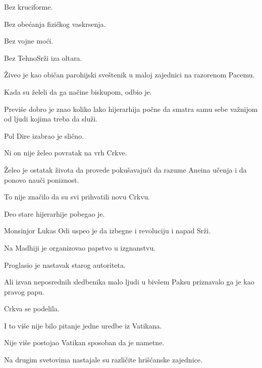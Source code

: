 \bigskip

Bez kruciforme.

Bez obećanja fizičkog vaskrsenja.

Bez vojne moći.

\bigskip

Bez TehnoSrži iza oltara.

\bigskip

Živeo je kao običan parohijski sveštenik u maloj zajednici na razorenom Pacemu.

\bigskip

Kada su želeli da ga načine biskupom, odbio je.

\bigskip

Previše dobro je znao koliko lako hijerarhija počne da smatra samu sebe važnijom od ljudi kojima treba da služi.

\bigskip

Pol Dire izabrao je slično.

\bigskip

Ni on nije želeo povratak na vrh Crkve.

\bigskip

Želeo je ostatak života da provede pokušavajući da razume Aneina učenja i da ponovo nauči poniznost.

\bigskip

To nije značilo da su svi prihvatili novu Crkvu.

\bigskip

Deo stare hijerarhije pobegao je.

\bigskip

Monsinjor Lukas Odi uspeo je da izbegne i revoluciju i napad Srži.

Na Madhiji je organizovao papstvo u izgnanstvu.

\bigskip

Proglasio je nastavak starog autoriteta.

\bigskip

Ali izvan neposrednih sledbenika malo ljudi u bivšem Paksu priznavalo ga je kao pravog papu.

\bigskip

Crkva se podelila.

\bigskip

I to više nije bilo pitanje jedne uredbe iz Vatikana.

\bigskip

Nije više postojao Vatikan sposoban da je nametne.

\bigskip

Na drugim svetovima nastajale su različite hrišćanske zajednice.

